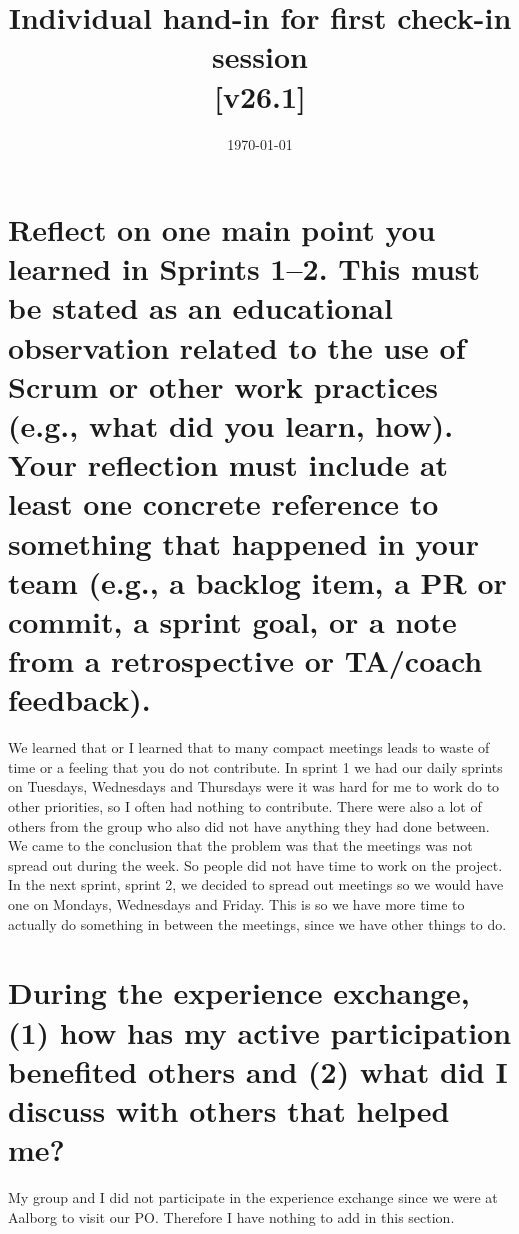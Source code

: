 \documentclass{article}
\title{Individual hand-in for first check-in session %
	\\[10pt] %
	\normalsize{[v26.1]}}
\date{\today}
\begin{document}
\maketitle

\vfill

\newpage





\section{Reflect on one main point you learned in Sprints 1–2. This must be stated as an educational observation related to the use of Scrum or other work practices (e.g., what did you learn, how). Your reflection must include at least one concrete reference to something that happened in your team (e.g., a backlog item, a PR or commit, a sprint goal, or a note from a retrospective or TA/coach feedback).}
\label{sec:actual}
We learned that or I learned that to many compact meetings leads to waste of time or a feeling that you do not contribute.
In sprint 1 we had our daily sprints on Tuesdays, Wednesdays and Thursdays were it was hard for me to work do to other priorities, so I often had nothing to contribute.
There were also a lot of others from the group who also did not have anything they had done between. 
We came to the conclusion that the problem was that the meetings was not spread out during the week.
So people did not have time to work on the project.
In the next sprint, sprint 2, we decided to spread out meetings so we would have one on Mondays, Wednesdays and Friday.
This is so we have more time to actually do something in between the meetings, since we have other things to do.

\section{During the experience exchange, (1) how has my active participation benefited others and (2) what did I discuss with others that helped me?}
\label{sec:exchange}
My group and I did not participate in the experience exchange since we were at Aalborg to visit our PO.
Therefore I have nothing to add in this section.
\end{document}
